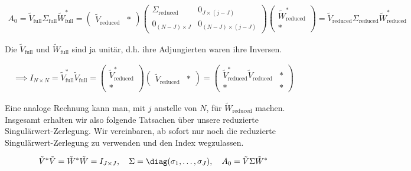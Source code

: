 \begin{align*}
    A_0
    =
    \tilde V_\mathrm{full} \Sigma_\mathrm{full} \tilde W_\mathrm{full}^\ast
    =
    \begin{pmatrix}
        \tilde V_\mathrm{reduced} & \ast
    \end{pmatrix}
    \begin{pmatrix}
        \Sigma_\mathrm{reduced} & 0_{J \times (j - J)}       \\
        0_{(N - J) \times J}    & 0_{(N - J) \times (j - J)}
    \end{pmatrix}
    \begin{pmatrix}
        \tilde W_\mathrm{reduced}^\ast \\ \ast
    \end{pmatrix}
    =
    \tilde V_\mathrm{reduced} \Sigma_\mathrm{reduced} \tilde W_\mathrm{reduced}^\ast
\end{align*}

Die $\tilde V_\mathrm{full}$ und $\tilde W_\mathrm{full}$ sind ja unitär, d.h. ihre Adjungierten waren ihre Inversen.

\begin{align*}
    \implies
    I_{N \times N}
    =
    \tilde V_\mathrm{full}^\ast \tilde V_\mathrm{full}
    =
    \begin{pmatrix}
        \tilde V_\mathrm{reduced}^\ast \\ \ast
    \end{pmatrix}
    \begin{pmatrix}
        \tilde V_\mathrm{reduced} & \ast
    \end{pmatrix}
    =
    \begin{pmatrix}
        \tilde V_\mathrm{reduced}^\ast \tilde V_\mathrm{reduced} & \ast \\
        \ast                                                     & \ast
    \end{pmatrix}
\end{align*}

Eine analoge Rechnung kann man, mit $j$ anstelle von $N$, für $\tilde W_\mathrm{reduced}$ machen.
Insgesamt erhalten wir also folgende Tatsachen über unsere reduzierte Singulärwert-Zerlegung.
Wir vereinbaren, ab sofort nur noch die reduzierte Singulärwert-Zerlegung zu verwenden und den Index wegzulassen.

\begin{align} \label{eq:singulärwert_zerlegung}
    \tilde V^\ast \tilde V
    =
    \tilde W^\ast \tilde W
    =
    I_{J \times J},
    \quad
    \Sigma = \diag(\sigma_1, \dots, \sigma_J),
    \quad
    A_0 = \tilde V \Sigma \tilde W^\ast
\end{align}

